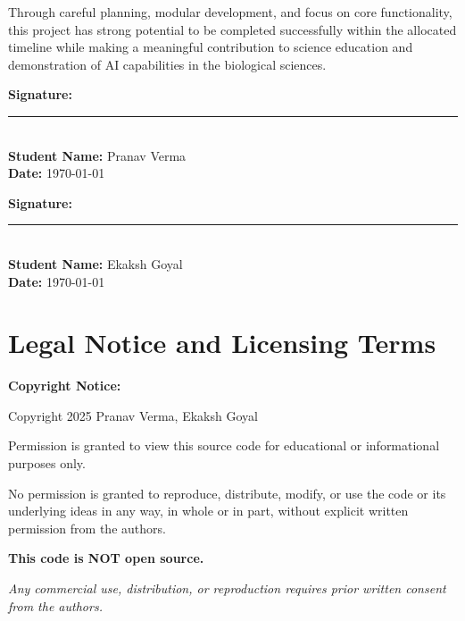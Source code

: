 \documentclass[12pt,a4paper]{article}
\begin{document}
Through careful planning, modular development, and focus on core functionality, this project has strong potential to be completed successfully within the allocated timeline while making a meaningful contribution to science education and demonstration of AI capabilities in the biological sciences.

\vspace{1cm}

\noindent\textbf{Signature:} \rule{5cm}{0.4pt}\\
\textbf{Student Name:} Pranav Verma\\
\textbf{Date:} \today

\vspace{1cm}

\noindent\textbf{Signature:} \rule{5cm}{0.4pt}\\
\textbf{Student Name:} Ekaksh Goyal\\
\textbf{Date:} \today

\vspace{1cm}

\section*{Legal Notice and Licensing Terms}

\noindent\textbf{Copyright Notice:}

\vspace{0.3cm}

\noindent Copyright 2025 Pranav Verma, Ekaksh Goyal

\vspace{0.3cm}

\noindent Permission is granted to view this source code for educational or informational purposes only.

\vspace{0.3cm}

\noindent No permission is granted to reproduce, distribute, modify, or use the code or its underlying ideas in any way, in whole or in part, without explicit written permission from the authors.

\vspace{0.3cm}

\noindent\textbf{This code is NOT open source.}

\vspace{0.5cm}

\noindent\textit{Any commercial use, distribution, or reproduction requires prior written consent from the authors.}
\end{document}
